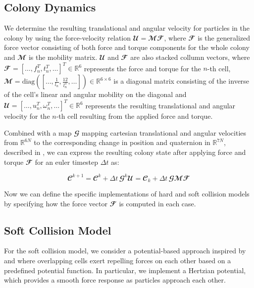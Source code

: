 \documentclass[conference]{IEEEtran}
\begin{document}
\subsection{Colony Dynamics}

We determine the resulting translational and angular velocity for particles in the colony by using the force-velocity relation $\mathbfcal{U} = \mathbfcal{M} \mathbfcal{F}$, where $\mathbfcal{F}$ is the generalized force vector consisting of both force and torque components for the whole colony and $\mathbfcal{M}$ is the mobility matrix. $\mathbfcal{U}$ and $\mathbfcal{F}$ are also stacked collumn vectors, where $\mathbfcal{F} = [\dots, f_n^T, t_n^T, \dots]^T \in \mathbb{R}^{6}$ represents the force and torque for the $n$-th cell, $\mathbfcal{M} = \text{diag}([\dots, \frac{1}{l_n}, \frac{12}{l_n^3}, \dots]) \in \mathbb{R}^{6 \times 6}$ is a diagonal matrix consisting of the inverse of the cell's linear and angular mobility on the diagonal and $\mathbfcal{U} = [\dots, u_n^T, \omega_n^T, \dots]^T \in \mathbb{R}^{6}$ represents the resulting translational and angular velocity for the $n$-th cell resulting from the applied force and torque.

Combined with a map $\mathbfcal{G}$ mapping cartesian translational and angular velocities from $\mathbb{R}^{6N}$ to the corresponding change in position and quaternion in $\mathbb{R}^{7N}$, described in \cite{Weady2024}, we can express the resulting colony state after applying force and torque $\mathbfcal{F}$ for an euler timestep $\Delta t$ as:

\begin{equation}
    \mathbfcal{C}^{k+1}  = \mathbfcal{C}^k + \Delta t \, \mathbfcal{G}^k\mathbfcal{U} = \mathbfcal{C}_k + \Delta t \, \mathbfcal{G}\mathbfcal{M} \mathbfcal{F}
\end{equation}
\label{eq:colony_update}



Now we can define the specific implementations of hard and soft collision models by specifying how the force vector $\mathbfcal{F}$ is computed in each case.

\newpage

\subsection{Soft Collision Model}

For the soft collision model, we consider a potential-based approach inspired by \cite{Warren2019} and \cite{You2018} where overlapping cells exert repelling forces on each other based on a predefined potential function. In particular, we implement a Hertzian potential, which provides a smooth force response as particles approach each other.
\end{document}
